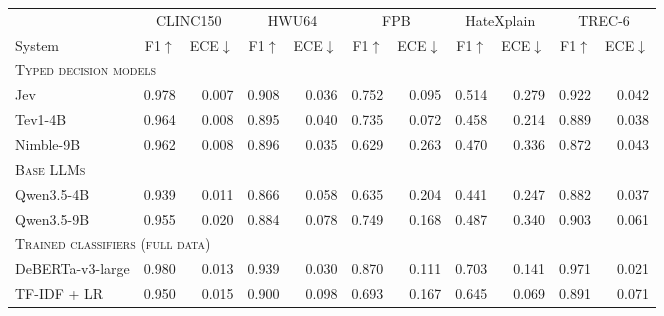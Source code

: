 \begin{tabular}{lrrrrrrrrrr}
\toprule
 & \multicolumn{2}{c}{CLINC150} & \multicolumn{2}{c}{HWU64} & \multicolumn{2}{c}{FPB} & \multicolumn{2}{c}{HateXplain} & \multicolumn{2}{c}{TREC-6} \\
\cmidrule(lr){2-3} \cmidrule(lr){4-5} \cmidrule(lr){6-7} \cmidrule(lr){8-9} \cmidrule(lr){10-11}
System & F1$\uparrow$ & ECE$\downarrow$ & F1$\uparrow$ & ECE$\downarrow$ & F1$\uparrow$ & ECE$\downarrow$ & F1$\uparrow$ & ECE$\downarrow$ & F1$\uparrow$ & ECE$\downarrow$ \\
\midrule
\multicolumn{11}{l}{\textsc{Typed decision models}} \\
Jev & 0.978 & 0.007 & 0.908 & 0.036 & 0.752 & 0.095 & 0.514 & 0.279 & 0.922 & 0.042 \\
Tev1-4B & 0.964 & 0.008 & 0.895 & 0.040 & 0.735 & 0.072 & 0.458 & 0.214 & 0.889 & 0.038 \\
Nimble-9B & 0.962 & 0.008 & 0.896 & 0.035 & 0.629 & 0.263 & 0.470 & 0.336 & 0.872 & 0.043 \\
\midrule
\multicolumn{11}{l}{\textsc{Base LLMs}} \\
Qwen3.5-4B & 0.939 & 0.011 & 0.866 & 0.058 & 0.635 & 0.204 & 0.441 & 0.247 & 0.882 & 0.037 \\
Qwen3.5-9B & 0.955 & 0.020 & 0.884 & 0.078 & 0.749 & 0.168 & 0.487 & 0.340 & 0.903 & 0.061 \\
\midrule
\multicolumn{11}{l}{\textsc{Trained classifiers (full data)}} \\
DeBERTa-v3-large & 0.980 & 0.013 & 0.939 & 0.030 & 0.870 & 0.111 & 0.703 & 0.141 & 0.971 & 0.021 \\
TF-IDF + LR & 0.950 & 0.015 & 0.900 & 0.098 & 0.693 & 0.167 & 0.645 & 0.069 & 0.891 & 0.071 \\
\bottomrule
\end{tabular}

